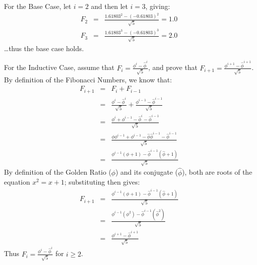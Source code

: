 For the Base Case, let $i = 2$ and then let $i = 3$, giving:
\begin{eqnarray*}
	F_2 & = & \frac{1.61803^2 - (-0.61803)^2}{\sqrt{5}} = 1.0 \\
	F_3 & = & \frac{1.61803^3 - (-0.61803)^3}{\sqrt{5}} = 2.0
\end{eqnarray*}
\ldots thus the base case holds.

For the Inductive Case, assume that $F_i = \frac{\phi^i - \hat{\phi}^i}{\sqrt{5}}$, and prove that $F_{i+1} = \frac{\phi^{i+1} - \hat{\phi}^{i+1}}{\sqrt{5}}$. By definition of the Fibonacci Numbers, we know that:
\begin{eqnarray*}
	F_{i+1} & = & F_i + F_{i-1} \\
	& = & \frac{\phi^i - \hat{\phi}^i}{\sqrt{5}} + \frac{\phi^{i-1} - \hat{\phi}^{i-1}}{\sqrt{5}} \\
	& = & \frac{\phi^i + \phi^{i-1} - \hat{\phi}^i - \hat{\phi}^{i-1}}{\sqrt{5}} \\
	& = & \frac{\phi \phi^{i-1} + \phi^{i-1} - \hat{\phi} \hat{\phi}^{i-1} - \hat{\phi}^{i-1}}{\sqrt{5}} \\
	& = & \frac{\phi^{i-1} \left(\phi + 1 \right) - \hat{\phi}^{i-1} ( \hat{\phi} + 1)}{\sqrt{5}}
\end{eqnarray*}
By definition of the Golden Ratio ($\phi$) and its conjugate ($\hat\phi$), both are roots of the equation $x^2 = x + 1$; substituting then gives:
\begin{eqnarray*}
	F_{i+1} & = & \frac{\phi^{i-1} \left(\phi + 1 \right) - \hat{\phi}^{i-1} ( \hat{\phi} + 1)}{\sqrt{5}} \\
	& = & \frac{\phi^{i-1}(\phi^2) - \hat{\phi}^{i-1}(\hat\phi^2)}{\sqrt{5}} \\
	& = & \frac{\phi^{i+1} - \hat{\phi}^{i+1}}{\sqrt{5}}
\end{eqnarray*}
Thus $F_i = \frac{\phi^i - \hat{\phi}^i}{\sqrt{5}}$ for $i \geq 2$.

